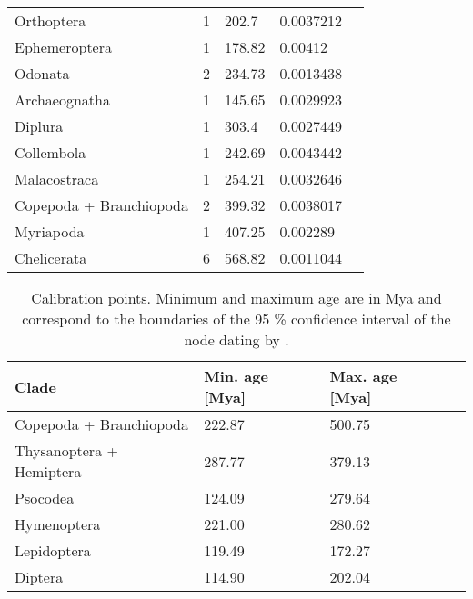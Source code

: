 \begin{table}
\begin{tabular}{@{}lllll@{}}
Orthoptera                 & 1                     & 202.7                     & 0.0037212                     \\
Ephemeroptera              & 1                     & 178.82                    & 0.00412                       \\
Odonata                    & 2                     & 234.73                    & 0.0013438                     \\
Archaeognatha              & 1                     & 145.65                    & 0.0029923                     \\
Diplura                    & 1                     & 303.4                     & 0.0027449                     \\
Collembola                 & 1                     & 242.69                    & 0.0043442                     \\
Malacostraca               & 1                     & 254.21                    & 0.0032646                     \\
Copepoda + Branchiopoda    & 2                     & 399.32                    & 0.0038017                     \\
Myriapoda                  & 1                     & 407.25                    & 0.002289                      \\
Chelicerata                & 6                     & 568.82                    & 0.0011044                     \\ \bottomrule
\end{tabular}
\end{table}

\begin{table}[]
\centering
\caption[Branch length calibration points from \citet{Misof2014}]{Calibration points. Minimum and maximum age are in Mya and correspond to the boundaries of the 95 \% confidence interval of the node dating by \citet{Misof2014}.}
\label{tab:calibration-points}
\begin{tabular}{@{}llll@{}}
\toprule
Clade                     & Min. age [Mya]  & Max. age [Mya] \\ 
\midrule
Copepoda + Branchiopoda   & 222.87          & 500.75         \\
Thysanoptera + Hemiptera  & 287.77          & 379.13         \\
Psocodea                  & 124.09          & 279.64         \\ 
Hymenoptera               & 221.00          & 280.62         \\
Lepidoptera               & 119.49          & 172.27         \\
Diptera                   & 114.90          & 202.04         \\
\bottomrule
\end{tabular}
\end{table}


